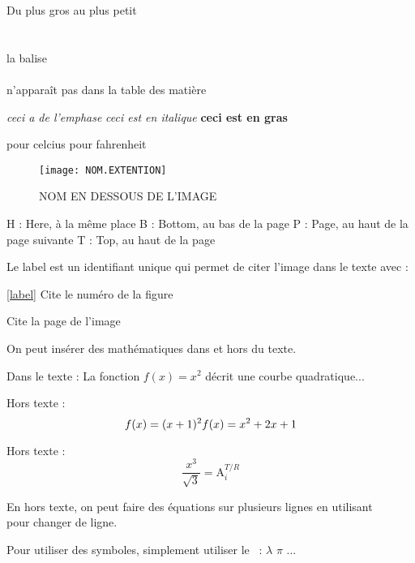 

 Du plus gros au plus petit
    \section{}
    \subsection{}
    \subsubsection{}
    \paragraph{}
    la balise \paragraph{} n'apparaît pas dans la table des matière


    \emph{ceci a de l'emphase}
    \textit{ceci est en italique}
    \textbf{ceci est en gras}

    \degC pour celcius
    \degF pour fahrenheit

   \begin{figure}[H]
   \centering
   \texttt{[image: NOM.EXTENTION]}
   \caption{NOM EN DESSOUS DE L'IMAGE} 
       \label{IDENTIFIANT_UNIQUE}
   \end{figure}

        H : Here, à la même place
        B : Bottom, au bas de la page
        P : Page, au haut de la page suivante
        T : Top, au haut de la page
    
        Le label est un identifiant unique qui permet de 
        citer l'image dans le texte avec :
        
        \ref{label}
            Cite le numéro de la figure
            
        \pageref{label}
            Cite la page de l'image
 

    On peut insérer des mathématiques dans et hors du texte.
    
    Dans le texte :
        La fonction $f(x) = x^2$ décrit une courbe quadratique...
    
    Hors texte :
        \begin{equation}
            f(x) = (x+1)^2 \\
            f(x) = x^2 + 2x + 1
        \end{equation}
        
    Hors texte :
    $$ \frac{x^3}{\sqrt{3}}  = \text{A}_i^{T/R} $$

    En hors texte, on peut faire des équations sur plusieurs lignes
    en utilisant \\ pour changer de ligne.
    
    Pour utiliser des symboles, simplement utiliser le \ :
        $ \lambda $
        $ \pi $
        ...

